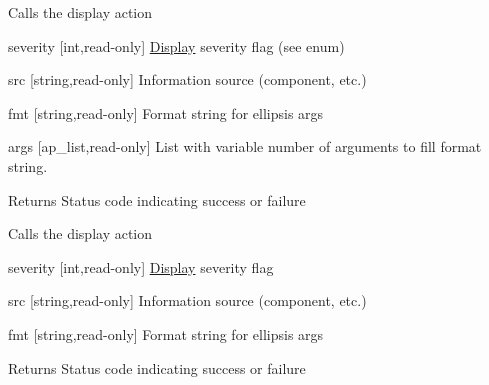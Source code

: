 \label{namespace_d_d4hep_ad4be91cbf746f4c9fc6f175c371c14c3}
Calls the display action \begin{DoxyItemize}
\item severity \mbox{[}int,read-\/only\mbox{]} \hyperlink{class_d_d4hep_1_1_display}{Display} severity flag (see enum) \item src \mbox{[}string,read-\/only\mbox{]} Information source (component, etc.) \item fmt \mbox{[}string,read-\/only\mbox{]} Format string for ellipsis args \item args \mbox{[}ap\_\-list,read-\/only\mbox{]} List with variable number of arguments to fill format string. \begin{DoxyReturn}{Returns}
Status code indicating success or failure
\end{DoxyReturn}
Calls the display action \item severity \mbox{[}int,read-\/only\mbox{]} \hyperlink{class_d_d4hep_1_1_display}{Display} severity flag \item src \mbox{[}string,read-\/only\mbox{]} Information source (component, etc.) \item fmt \mbox{[}string,read-\/only\mbox{]} Format string for ellipsis args \begin{DoxyReturn}{Returns}
Status code indicating success or failure 
\end{DoxyReturn}
\end{DoxyItemize}


